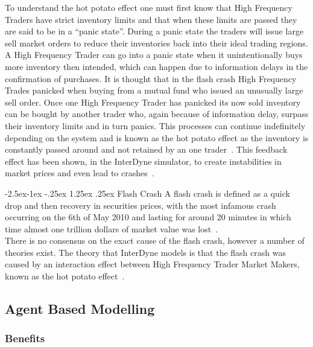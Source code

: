\documentclass{article}
\makeatletter
\renewcommand\paragraph{\@startsection{paragraph}{4}{\z@}%
	{-2.5ex\@plus -1ex \@minus -.25ex}%
	{1.25ex \@plus .25ex}%
	{\normalfont\normalsize\bfseries}}
\makeatother
\begin{document}
To understand the hot potato effect one must first know that High Frequency Traders have strict inventory limits and that when these limits are passed they are said to be in a ``panic state''. During a panic state the traders will issue large sell market orders to reduce their inventories back into their ideal trading regions. A High Frequency Trader can go into a panic state when it unintentionally buys more inventory then intended, which can happen due to information delays in the confirmation of purchases. It is thought that in the flash crash High Frequency Trades panicked when buying from a mutual fund who issued an unusually large sell order. Once one High Frequency Trader has panicked its now sold inventory can be bought by another trader who, again because of information delay, surpass their inventory limits and in turn panics. This processes can continue indefinitely depending on the system and is known as the hot potato effect as the inventory is constantly passed around and not retained by an one trader~\cite{Elias_Paper}. This feedback effect has been shown, in the InterDyne simulator, to create instabilities in market prices and even lead to crashes~\cite{DynamicCoupling_Chris}.   

\paragraph{Flash Crash} 
A flash crash is defined as a quick drop and then recovery in securities prices, with the most infamous  crash occurring on the 6th of May 2010 and lasting for around 20 minutes in which time almost one trillion dollars of market value was lost~\cite{Vikram_Paper}.\\
There is no consensus on the exact cause of the flash crash, however a number of theories exist. The theory that InterDyne models is that the flash crash was caused by an interaction effect between High Frequency Trader Market Makers, known as the hot potato effect~\cite{Elias_Paper}. 

\subsection{Agent Based Modelling}

\subsubsection{Benefits} 
\end{document}
